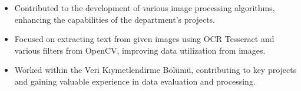 \documentclass[10pt,a4paper,ragged2e,withhyper]{altacv}
\begin{document}
\begin{paracol}{2}
\divider
{}
\begin{itemize}
  \item Contributed to the development of various image processing algorithms, enhancing the capabilities of the department's projects.
  \item Focused on extracting text from given images using OCR Tesseract and various filters from OpenCV, improving data utilization from images.
  \item Worked within the Veri Kıymetlendirme Bölümü, contributing to key projects and gaining valuable experience in data evaluation and processing.
\end{itemize}





\end{paracol}
\end{document}

